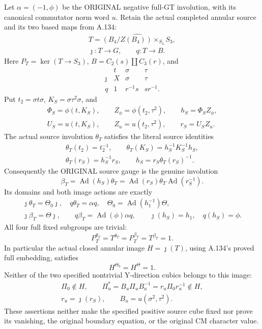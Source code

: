 Let \(\alpha=(-1,\phi)\) be the ORIGINAL negative full-GT involution,
with its canonical commutator norm word \(u\). Retain the actual
completed annular source and its two based maps from A.134:
\[
 \begin{gathered}
 T=\widehat{(B_4/Z(B_4))\times_{S_4}S_3},\\
 \jmath:T\longrightarrow G,\qquad q:T\longrightarrow B.
 \end{gathered}
 \tag{A.135.1}
\]
Here \(P_T=\ker(T\to S_3)\), \(B=C_2(s)\amalg C_3(r)\), and
\[
 \begin{array}{c|ccc}
       &t&\sigma&\tau\\\hline
 \jmath&X&\sigma&\tau\\
 q&1&r^{-1}s&sr^{-1}.
 \end{array}
 \tag{A.135.2}
\]
Put \(t_2=\sigma t\sigma\), \(K_S=\sigma\tau^2\sigma\), and
\[
 \begin{gathered}
 \Phi_S=\phi(t,K_S),\qquad Z_\phi=\phi(t_2,\tau^2),\qquad
 h_S=\Phi_S Z_\phi,\\
 U_S=u(t,K_S),\qquad Z_u=u(t_2,\tau^2),\qquad r_S=U_SZ_u.
 \end{gathered}
 \tag{A.135.3}
\]
The actual source involution \(\theta_T\) satisfies the literal
source identities
\[
 \begin{gathered}
 \theta_T(t_2)=t_2^{-1},\qquad
 \theta_T(K_S)=h_S^{-1}K_S^{-1}h_S,\\
 \theta_T(r_S)=h_S^{-1}r_S,\qquad
 h_S=r_S\theta_T(r_S)^{-1}.
 \end{gathered}
 \tag{A.135.4}
\]
Consequently the ORIGINAL source gauge is the genuine involution
\[
 \beta_T=\operatorname{Ad}(h_S)\theta_T
 =\operatorname{Ad}(r_S)\theta_T\operatorname{Ad}(r_S^{-1}).
 \tag{A.135.5}
\]
Its domains and both image actions are exactly
\[
 \begin{gathered}
 \jmath\theta_T=\Theta_0\jmath,
 \quad q\theta_T=\alpha q,
 \quad \Theta_0=\operatorname{Ad}(h_1^{-1})\Theta,\\
 \jmath\beta_T=\Theta\jmath,
 \qquad q\beta_T=\operatorname{Ad}(\phi)\alpha q,
 \qquad \jmath(h_S)=h_1,\quad q(h_S)=\phi.
 \end{gathered}
 \tag{A.135.6}
\]
All four full fixed subgroups are trivial:
\[
 P_T^{\theta_T}=T^{\theta_T}
       =P_T^{\beta_T}=T^{\beta_T}=1.
 \tag{A.135.7}
\]
In particular the actual closed annular image \(H=\jmath(T)\),
using A.134's proved full embedding, satisfies
\[
 H^{\Theta_0}=H^\Theta=1.
 \tag{A.135.8}
\]
Neither of the two specified nontrivial Y-direction cubics belongs
to this image:
\[
 \begin{gathered}
 \Pi_0\notin H,\qquad
 \Pi_u^*=B_u\Pi_u B_u^{-1}=r_u\Pi_0r_u^{-1}\notin H,\\
 r_u=\jmath(r_S),\qquad B_u=u(\sigma^2,\tau^2).
 \end{gathered}
 \tag{A.135.9}
\]
These assertions neither make the specified positive source cube
fixed nor prove its vanishing, the original boundary equation,
or the original CM character value.

